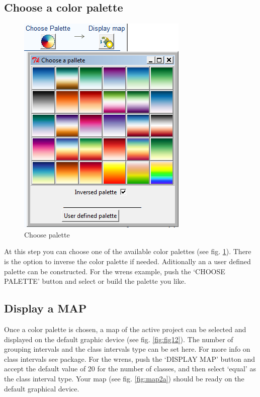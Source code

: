 \documentclass[ a4paper ]{article}
\begin{document}
	
	\subsection{Choose a color palette}
	\begin{figure}[htbp]
	  \begin{center}
		\includegraphics[width=0.5\linewidth]{fig11}
		\caption{\label{fig:fig11} Choose palette }
	  \end{center}
	\end{figure}

At this step you can  choose one of the available color palettes (see fig. \ref{fig:fig11}). There is the option to inverse the color palette if needed. Aditionally an a user defined palette can be constructed. For the wrens example, push the `CHOOSE PALETTE' button and select or build the palette you like.

	\subsection{Display a MAP}

Once a color palette is chosen, a map of the active project can be selected and displayed on the default graphic device (see fig. \ref{fig:fig12}). The number of grouping intervals and the class intervals type can be set here. For more info on class intervals see \cite{classInt} package. 
For the wrens, push the `DISPLAY MAP' button and accept the default value of 20 for the number of classes, and then select `equal' as the class interval type. Your map (see fig. \ref{fig:map2a}) should be ready on the default graphical device.
\end{document}
